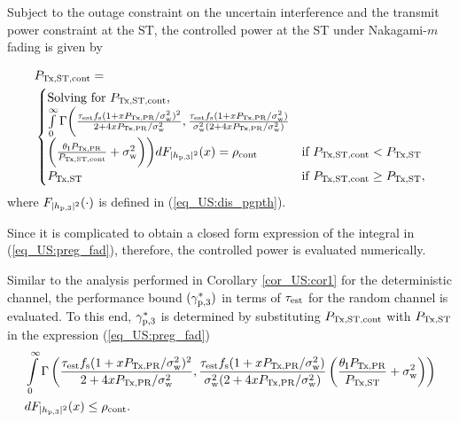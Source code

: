 \begin{lemma} \label{lm_US:lm6}
\normalfont
Subject to the outage constraint on the uncertain interference and the transmit power constraint at the ST, the controlled power at the ST under Nakagami-$m$ fading is given by %

\begin{align}
&P_{\text{Tx,ST,cont}} = \nonumber \\ 
& \begin{cases} 
\text{Solving for $P_{\text{Tx,ST,cont}}$, } \\ \int\limits_{0}^{\infty} \Gamma\bigg(\frac{\tau_{\text{est}} f_{\text{s}} (1 + x P_{\text{Tx,PR}}/\sigma^2_{\text{w}})^2}{2 + 4 x P_{\text{Tx,PR}}/\sigma^2_{\text{w}}}, \frac{\tau_{\text{est}} f_{\text{s}} (1 + x P_{\text{Tx,PR}}/\sigma^2_{\text{w}})}{\sigma^2_{\text{w}} (2 + 4 x P_{\text{Tx,PR}}/\sigma^2_{\text{w}})} \\ \bigg(\frac{\theta_{\text{I}}P_{\text{Tx,PR}}}{P_{\text{Tx,ST,cont}}}  +  \sigma^2_{\text{w}} \bigg)\bigg) d F_{|h_{\text{p,3}}|^2}(x) = \rho_{\text{cont}} & \mbox{if } P_{\text{Tx,ST,cont}} < P_{\text{Tx,ST}} \\
P_{\text{Tx,ST}} & \mbox{if } P_{\text{Tx,ST,cont}} \ge P_{\text{Tx,ST}},
\end{cases}
\label{eq_US:preg_fad} 
\end{align}
where %
$F_{|h_{\text{p,3}}|^2}(\cdot)$ is defined in (\ref{eq_US:dis_pgpth}). 
\end{lemma} 
\begin{IEEEproof}[Solution]
Since it is complicated to obtain a closed form expression of the integral in (\ref{eq_US:preg_fad}), therefore, the controlled power is evaluated numerically.  
\end{IEEEproof}
Similar to the analysis performed in Corollary \ref{cor_US:cor1} for the deterministic channel, the performance bound $({\gamma}_{\text{p,3}}^*)$ in terms of $\tau_{\text{est}}$ for the random channel is evaluated. To this end, ${\gamma}_{\text{p,3}}^*$ is determined by substituting $P_{\text{Tx,ST,cont}}$ with $P_{\text{Tx,ST}}$ in the expression (\ref{eq_US:preg_fad}) 
\begin{align}
&\int\limits_{0}^{\infty} \Gamma\left( \frac{\tau_{\text{est}} f_{\text{s}} (1 + x P_{\text{Tx,PR}}/\sigma^2_{\text{w}})^2}{2 + 4 x P_{\text{Tx,PR}}/\sigma^2_{\text{w}}}, \frac{\tau_{\text{est}} f_{\text{s}} (1 + x P_{\text{Tx,PR}}/\sigma^2_{\text{w}})}{\sigma^2_{\text{w}} (2 + 4 x P_{\text{Tx,PR}}/\sigma^2_{\text{w}})}  \left(\frac{\theta_{\text{I}}P_{\text{Tx,PR}}}{P_{\text{Tx,ST}}} + \sigma^2_{\text{w}} \right)\right) \nonumber \\ & d F_{|h_{\text{p,3}}|^2}(x) \le \rho_{\text{cont}}. \label{eq_US:or_fad}
\end{align}
